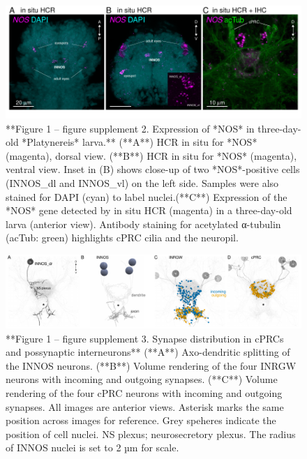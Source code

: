 \documentclass[
  10pt,
  onecolumn]{article}
\begin{document}
\begin{figure}
\includegraphics[width=25in]{figures/Fig1_sup2} \caption{**Figure 1 -- figure supplement 2. Expression of *NOS* in three-day-old *Platynereis* larva.** (**A**) HCR in situ for *NOS* (magenta), dorsal view. (**B**) HCR in situ for *NOS* (magenta), ventral view. Inset in (B) shows close-up of two *NOS*-positive cells (INNOS_dl and INNOS_vl) on the left side. Samples were also stained for DAPI (cyan) to label nuclei.(**C**) Expression of the *NOS* gene detected by in situ HCR (magenta) in a three-day-old larva (anterior view). Antibody staining for acetylated α-tubulin (acTub: green) highlights cPRC cilia and the neuropil.}\label{fig:unnamed-chunk-10}
\end{figure}

\begin{figure}
\includegraphics[width=33.33in]{figures/Fig1_sup3} \caption{**Figure 1 -- figure supplement 3. Synapse distribution in cPRCs and possynaptic interneurons** (**A**) Axo-dendritic splitting of the INNOS neurons. (**B**) Volume rendering of the four INRGW neurons with incoming and outgoing synapses. (**C**) Volume rendering of the four cPRC neurons with incoming and outgoing synapses. All images are anterior views. Asterisk marks the same position across images for reference. Grey speheres indicate the position of cell nuclei. NS plexus; neurosecretory plexus. The radius of INNOS nuclei is set to 2 µm for scale.}\label{fig:unnamed-chunk-11}
\end{figure}
\end{document}
